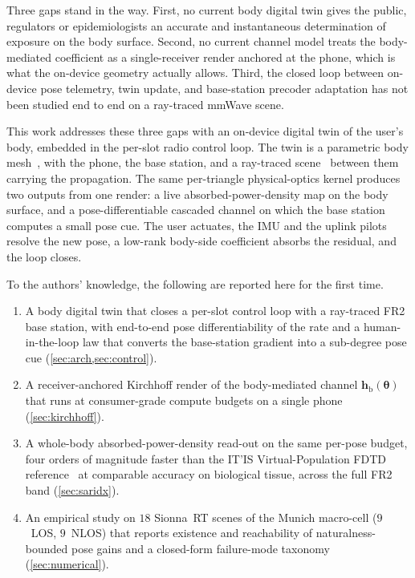 \documentclass[journal,twocolumn,10pt]{IEEEtran}
\theoremstyle{plain}
\theoremstyle{definition}
\theoremstyle{remark}
\newcommand{\thetab}{\bm{\theta}}
\newcommand{\hbody}{\bm{h}_{\mathrm{b}}}
\begin{document}
Three gaps stand in the way. First, no current body digital twin
gives the public, regulators or epidemiologists an accurate and
instantaneous determination of exposure on the body surface. Second,
no current channel model treats the body-mediated coefficient as a
single-receiver render anchored at the phone, which is what the
on-device geometry actually allows. Third, the closed loop between
on-device pose telemetry, twin update, and base-station precoder
adaptation has not been studied end to end on a ray-traced mmWave
scene.

This work addresses these three gaps with an on-device digital twin
of the user's body, embedded in the per-slot radio control loop. The
twin is a parametric body mesh~\cite{SMPLX2019}, with the phone, the
base station, and a ray-traced scene~\cite{Hoydis2023Sionna} between
them carrying the propagation. The same per-triangle physical-optics
kernel produces two outputs from one render: a live
absorbed-power-density map on the body surface, and a
pose-differentiable cascaded channel on which the base station
computes a small pose cue. The user actuates, the IMU and the uplink
pilots resolve the new pose, a low-rank body-side coefficient absorbs
the residual, and the loop closes.

To the authors' knowledge, the following are reported here for the
first time.
\begin{enumerate}
\item A body digital twin that closes a per-slot control loop with a
ray-traced FR2 base station, with end-to-end pose differentiability
of the rate and a human-in-the-loop law that converts the
base-station gradient into a sub-degree pose cue
(\cref{sec:arch,sec:control}).
\item A receiver-anchored Kirchhoff render of the body-mediated
channel $\hbody(\thetab)$ that runs at consumer-grade compute budgets
on a single phone (\cref{sec:kirchhoff}).
\item A whole-body absorbed-power-density read-out on the same per-pose
budget, four orders of magnitude faster than the IT'IS
Virtual-Population FDTD reference~\cite{Christ2010VF} at comparable
accuracy on biological tissue, across the full FR2
band (\cref{sec:saridx}).
\item An empirical study on $18$ Sionna~RT scenes of the Munich
macro-cell ($9$~LOS, $9$~NLOS) that reports existence and
reachability of naturalness-bounded pose gains and a closed-form
failure-mode taxonomy (\cref{sec:numerical}).
\end{enumerate}
\end{document}
